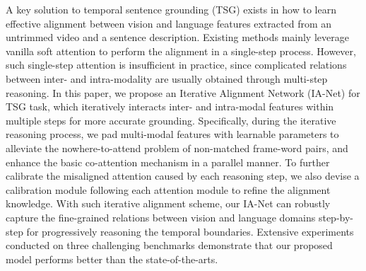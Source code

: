 A key solution to temporal sentence grounding (TSG) exists in how to learn effective alignment between vision and language features extracted from an untrimmed video and a sentence description. Existing methods mainly leverage vanilla soft attention to perform the alignment in a single-step process. However, such single-step attention is insufficient in practice, since complicated relations between inter- and intra-modality are usually obtained through multi-step reasoning.  In this paper, we propose an Iterative Alignment Network (IA-Net) for TSG task, which iteratively interacts inter- and intra-modal features within multiple steps for more accurate grounding. Specifically, during the iterative reasoning process, we pad multi-modal features with learnable parameters to alleviate the nowhere-to-attend problem of non-matched frame-word pairs, and enhance the basic co-attention mechanism in a parallel manner. To further calibrate the misaligned attention caused by each reasoning step, we also devise a calibration module following each attention module to refine the alignment knowledge. With such iterative alignment scheme, our IA-Net can robustly capture the fine-grained relations between vision and language domains step-by-step for progressively reasoning the temporal boundaries. Extensive experiments conducted on three challenging benchmarks demonstrate that our proposed model performs better than the state-of-the-arts.
